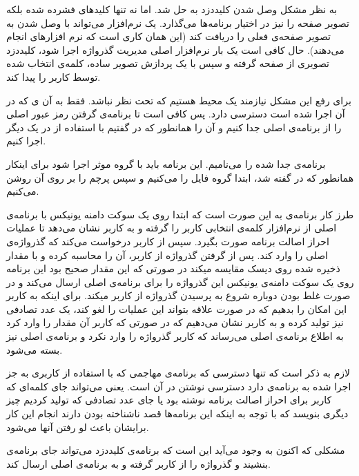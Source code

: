 به نظر مشکل وصل شدن کلیددزد به  حل شد. اما  نه تنها کلید‌های فشرده شده بلکه تصویر صفحه را نیز در اختیار برنامه‌ها می‌گذارد. یک نرم‌افزار می‌تواند با وصل شدن به  تصویر صفحه‌ی فعلی را دریافت کند (این همان کاری است که نرم افزارهای  انجام می‌دهند). حال کافی است یک بار نرم‌افزار اصلی مدیریت گذرواژه اجرا شود، کلیددزد تصویری از صفحه گرفته و سپس با یک پردازش تصویر ساده، کلمه‌ی انتخاب شده توسط کاربر را پیدا کند.

برای رفع این مشکل نیازمند یک محیط هستیم که تحت نظر  نباشد.  فقط به آن ی که در آن اجرا شده است دسترسی دارد. پس کافی است تا برنامه‌ی گرفتن رمز عبور اصلی را از برنامه‌ی اصلی جدا کنیم و آن را همانطور که در  گفتیم با استفاده از  در یک  دیگر اجرا کنیم. 

برنامه‌ی جدا شده را  می‌نامیم. این برنامه باید با گروه موثر  اجرا شود برای اینکار همانطور که در  گفته شد، ابتدا گروه فایل را  می‌کنیم و سپس پرچم  را بر روی آن روشن می‌کنیم.

طرز کار برنامه‌ی  به این صورت است که ابتدا روی یک سوکت دامنه یونیکس با برنامه‌ی اصلی از نرم‌افزار  کلمه‌ی انتخابی کاربر را گرفته و به کاربر نشان می‌دهد تا عملیات احراز اصالت برنامه صورت بگیرد. سپس از کاربر درخواست می‌کند که گذرواژه‌ی اصلی را وارد کند. پس از گرفتن گذرواژه از کاربر،  آن را محاسبه کرده و با مقدار ذخیره شده روی دیسک مقایسه میکند در صورتی که این مقدار صحیح بود این برنامه روی یک سوکت دامنه‌ی یونیکس این گذرواژه را برای برنامه‌ی اصلی ارسال می‌کند و در صورت غلط بودن دوباره شروع به پرسیدن گذرواژه از کاربر میکند. برای اینکه به کاربر این امکان را بدهیم که در صورت علاقه بتواند این عملیات را لغو کند، یک عدد تصادفی نیز تولید کرده و به کاربر نشان می‌دهیم که در صورتی که کاربر آن مقدار را وارد کرد  به اطلاع برنامه‌ی اصلی می‌رساند که کاربر گذرواژه را وارد نکرد و برنامه‌ی اصلی نیز بسته می‌شود.

لازم به ذکر است که تنها دسترسی که برنامه‌ی مهاجمی که با استفاده از کاربری به جز  اجرا شده به  برنامه‌ی  دارد دسترسی نوشتن در آن است. یعنی می‌تواند جای کلمه‌ای که کاربر برای احراز اصالت برنامه نوشته بود یا جای عدد تصادفی که تولید کردیم چیز دیگری بنویسد که با توجه به اینکه این برنامه‌ها قصد ناشناخته بودن دارند انجام این کار برایشان باعث لو رفتن آنها می‌شود.

مشکلی که اکنون به وجود می‌آید این است که برنامه‌ی کلیددزد می‌تواند جای برنامه‌ی  بنشیند و گذرواژه را از کاربر گرفته و به برنامه‌ی اصلی ارسال کند. 

